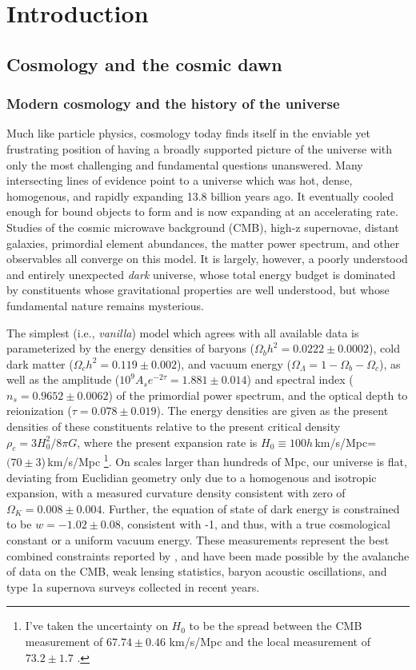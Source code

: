 \chapter{Introduction}


\section{Cosmology and the cosmic dawn}

\subsection{Modern cosmology and the history of the universe}

Much like particle physics, cosmology today finds itself in the enviable yet frustrating position of having a broadly supported picture of the universe with only the most challenging and fundamental questions unanswered. Many intersecting lines of evidence point to a universe which was hot, dense, homogenous, and rapidly expanding 13.8 billion years ago. It eventually cooled enough for bound objects to form and is now expanding at an accelerating rate. Studies of the cosmic microwave background (CMB), high-z supernovae, distant galaxies, primordial element abundances, the matter power spectrum, and other observables all converge on this model. It is largely, however, a poorly understood and entirely unexpected \textit{dark} universe, whose total energy budget is dominated by constituents whose gravitational properties are well understood, but whose fundamental nature remains mysterious. 

The simplest (i.e., \textit{vanilla}) model which agrees with all available data is parameterized by the energy densities of baryons ($\Omega_bh^2=0.0222\pm0.0002$), cold dark matter  ($\Omega_ch^2=0.119\pm0.002$), and vacuum energy ($\Omega_\Lambda=1-\Omega_b-\Omega_c$), as well as the amplitude ($10^{9}A_se^{-2\tau}=1.881\pm0.014$) and spectral index ($n_s=0.9652\pm0.0062$) of the primordial power spectrum, and the optical depth to reionization ($\tau=0.078\pm0.019$). 
The energy densities are given as the present densities of these constituents relative to the present critical density $\rho_c=3H_0^2/8\pi G$, where the present expansion rate is $H_0\equiv 100h$\,km/s/Mpc=$(70\pm3$)\,km/s/Mpc
\footnote{I've taken the uncertainty on $H_0$ to be the spread between the CMB measurement of $67.74\pm0.46$ km/s/Mpc \citep{planck16} and the local measurement of $73.2\pm1.7$ \citep{reiss16}.}. 
On scales larger than hundreds of Mpc, our universe is flat, deviating from Euclidian geometry only due to a homogenous and isotropic expansion, with a measured curvature density consistent with zero of $\Omega_K=0.008\pm0.004$. 
Further, the equation of state of dark energy is constrained to be $w=-1.02\pm0.08$, consistent with -1, and thus, with a true cosmological constant or a uniform vacuum energy. These measurements represent the best combined constraints reported by \citet{planck16}, and have been made possible by the avalanche of data on the CMB, weak lensing statistics, baryon acoustic oscillations, and type 1a supernova surveys collected in recent years. 

